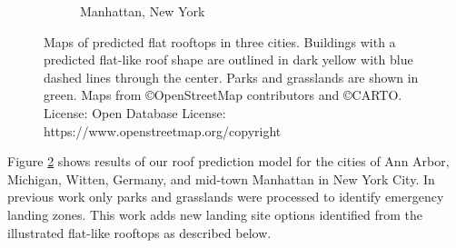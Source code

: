 \begin{figure}[!ht]
\begin{subfigure}[b]{0.30\textwidth}
   \caption{Manhattan, New York}\label{fig:ch5_ny-flat}
 \end{subfigure}
 \caption[Maps of predicted flat rooftops in three cities.]{Maps of predicted flat rooftops in three cities. Buildings with a predicted flat-like roof shape are outlined in dark yellow with blue dashed lines through the center.  Parks and grasslands are shown in green. Maps from \copyright OpenStreetMap contributors and \copyright CARTO. License: Open Database License: https://www.openstreetmap.org/copyright}\label{fig:ch5_all_flat_buildings}
\end{figure}

Figure \ref{fig:ch5_all_flat_buildings} shows results of our roof prediction model for the cities of Ann Arbor, Michigan, Witten, Germany, and mid-town Manhattan in New York City. In previous work only parks and grasslands were processed to identify emergency landing zones. This work adds new landing site options identified from the illustrated flat-like rooftops as described below. 




